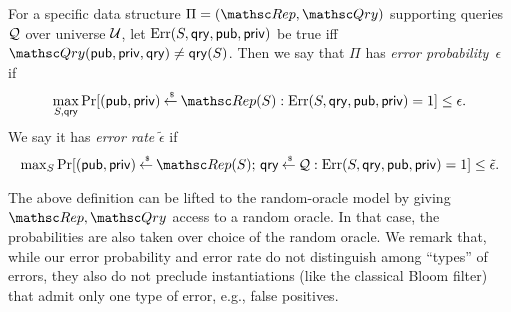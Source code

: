 
\begin{definition} \rm
For a specific data structure $\setprim=(\Rep, \Qry)$ supporting
queries ${\cal Q}$ over universe ${\cal U}$, let
$\mathrm{Err}(S,\mathsf{qry},{\sf pub},{\sf priv})$ be  true iff
$\Qry(\pubaux,\privaux, \qry) \neq \qry(S)$.  Then we say that $\Pi$
has \emph{error probability}~$\epsilon$ if
\[\max_{S,\qry}\Pr[(\pubaux,\privaux) \getsr \Rep(S) :
\mathrm{Err}(S,\qry,\pubaux,\privaux)=1 ] \leq \epsilon.\]
%
We say it has \emph{error rate} $\tilde{\epsilon}$ if
\[{\textstyle \max_{S}\Pr[(\pubaux,\privaux) \getsr \Rep(S);\, \qry \getsr \calQ :
\mathrm{Err}(S,\qry,\pubaux,\privaux)=1]} \leq \tilde{\epsilon}. \]
\end{definition}


The above definition can be lifted to the random-oracle model by
giving $\Rep, \Qry$ access to a random oracle. In that case, the
probabilities are also taken over choice of the random oracle. We
remark that, while our error probability and error rate do not
distinguish among ``types'' of errors, they also do not preclude
instantiations (like the classical Bloom filter) that admit only one
type of error, e.g., false positives.


